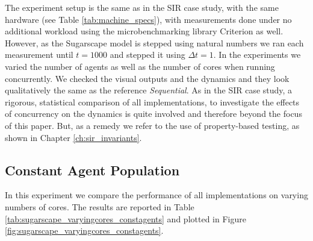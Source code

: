 \medskip

The experiment setup is the same as in the SIR case study, with the same hardware (see Table \ref{tab:machine_specs}), with measurements done under no additional workload using the microbenchmarking library Criterion \cite{criterion_serpentine, criterion_hackage} as well. However, as the Sugarscape model is stepped using natural numbers we ran each measurement until $t = 1000$ and stepped it using $\Delta t = 1$. In the experiments we varied the number of agents as well as the number of cores when running concurrently. We checked the visual outputs and the dynamics and they look qualitatively the same as the reference \textit{Sequential}. As in the SIR case study, a rigorous, statistical comparison of all implementations, to investigate the effects of concurrency on the dynamics is quite involved and therefore beyond the focus of this paper. But, as a remedy we refer to the use of property-based testing, as shown in Chapter \ref{ch:sir_invariants}.

\subsection{Constant Agent Population}
In this experiment we compare the performance of all implementations on varying numbers of cores. The results are reported in Table \ref{tab:sugarscape_varyingcores_constagents} and plotted in Figure \ref{fig:sugarscape_varyingcores_constagents}. 

